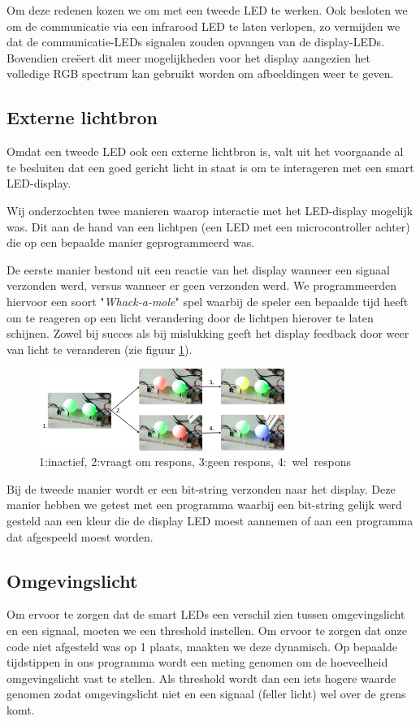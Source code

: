 \documentclass{article}
\begin{document}
Om deze redenen kozen we om met een tweede LED te werken. Ook besloten we om de communicatie via een infrarood LED te laten verlopen, zo vermijden we dat de communicatie-LEDs signalen zouden opvangen van de display-LEDs. Bovendien creëert dit meer mogelijkheden voor het display aangezien het volledige RGB spectrum kan gebruikt worden om afbeeldingen weer te geven. 

\subsection{Externe lichtbron}
Omdat een tweede LED ook een externe lichtbron is, valt uit het voorgaande al te besluiten dat een goed gericht licht in staat is om te interageren met een smart LED-display. 

Wij onderzochten twee manieren waarop interactie met het LED-display mogelijk was. Dit aan de hand van een lichtpen (een LED met een microcontroller achter) die op een bepaalde manier geprogrammeerd was.

De eerste manier bestond uit een reactie van het display wanneer een signaal verzonden werd, versus wanneer er geen verzonden werd. We programmeerden hiervoor een soort "\textit{Whack-a-mole}" spel waarbij de speler een bepaalde tijd heeft om te reageren op een licht verandering door de lichtpen hierover te laten schijnen. Zowel bij succes als bij mislukking geeft het display feedback door weer van licht te veranderen (zie figuur \ref{fig:mole}).
\begin{figure}
\centering
\includegraphics[width=8cm]{moleSequence.png}
\caption{1:inactief, 2:vraagt om respons, 3:geen respons, \mbox{4: wel respons}}
\label{fig:mole}
\end{figure}

Bij de tweede manier wordt er een bit-string verzonden naar het display. Deze manier hebben we getest met een programma waarbij een bit-string gelijk werd gesteld aan een kleur die de display LED moest aannemen of aan een programma dat afgespeeld moest worden.

\subsection{Omgevingslicht}
Om ervoor te zorgen dat de smart LEDs een verschil zien tussen omgevingslicht en een signaal, moeten we een threshold instellen. Om ervoor te zorgen dat onze code niet afgesteld was op 1 plaats, maakten we deze dynamisch. Op bepaalde tijdstippen in ons programma wordt een meting genomen om de hoeveelheid omgevingslicht vast te stellen. Als threshold wordt dan een iets hogere waarde genomen zodat omgevingslicht niet en een signaal (feller licht) wel over de grens komt.
\end{document}
